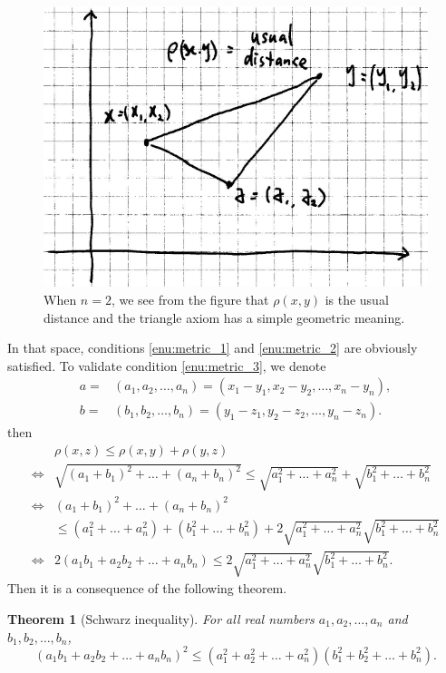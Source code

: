 \documentclass[a4paper,12pt]{article}
\newtheorem{thm}{Theorem}[section]
\theoremstyle{definition}
\theoremstyle{remark}
\begin{document}
\begin{figure}[h]
  \centering
  \includegraphics{fig1}
  \caption{When $n = 2$, we see from the figure that $\rho(x,y)$ is the usual distance and the triangle axiom has a simple geometric meaning.}
\end{figure}
In that space, conditions \ref{enu:metric_1} and \ref{enu:metric_2} are obviously satisfied. To validate condition \ref{enu:metric_3}, we denote
\begin{align*}
  a = {}& (a_1, a_2, \dotsc, a_n) = (x_1 - y_1, x_2 - y_2, \dotsc, x_n - y_n), \\
  b = {}& (b_1, b_2, \dotsc, b_n) = (y_1 - z_1, y_2 - z_2, \dotsc, y_n - z_n).
\end{align*}
then
\begin{align*}
  & \rho(x,z) \leq \rho(x,y) + \rho(y,z) \\
  \Longleftrightarrow {}& \sqrt{(a_1 + b_1)^2 + \dotsc + (a_n + b_n)^2} \leq \sqrt{a^2_1 + \dotsc + a^2_n} + \sqrt{b^2_1 + \dotsc + b^2_n} \\
  \Longleftrightarrow {}& (a_1 + b_1)^2 + \dotsc + (a_n + b_n)^2 \\
  & \leq (a^2_1 + \dotsc + a^2_n) + (b^2_1 + \dotsc + b^2_n) + 2 \sqrt{a^2_1 + \dotsc + a^2_n} \sqrt{b^2_1 + \dotsc + b^2_n} \\
  \Longleftrightarrow {}& 2(a_1b_1 + a_2b_2 + \dotsc + a_nb_n) \leq 2 \sqrt{a^2_1 + \dotsc + a^2_n} \sqrt{b^2_1 + \dotsc + b^2_n}.
\end{align*}
Then it is a consequence of the following theorem.
\begin{thm}[Schwarz inequality]
  For all real numbers $a_1, a_2, \dotsc, a_n$ and $b_1, b_2, \dotsc, b_n$,
  \begin{equation} \label{eq:Schwarz}
    (a_1b_1 + a_2b_2 + \dotsc + a_nb_n)^2 \leq (a^2_1 + a^2_2 + \dotsc + a^2_n) (b^2_1 + b^2_2 + \dotsc + b^2_n).
  \end{equation}
\end{thm}
\end{document}
